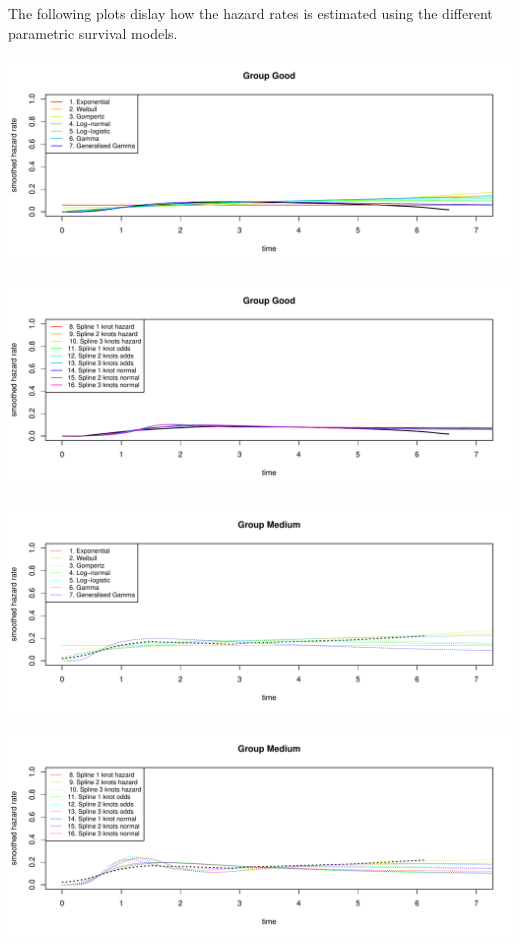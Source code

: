 \documentclass[
]{article}
\begin{document}
The following plots dislay how the hazard rates is estimated using the
different parametric survival models.

\begin{flushleft}\includegraphics[height=0.29\textheight]{Images/plot_haz_pred-1} \end{flushleft}

\begin{flushleft}\includegraphics[height=0.29\textheight]{Images/plot_haz_pred-2} \end{flushleft}

\begin{flushleft}\includegraphics[height=0.29\textheight]{Images/plot_haz_pred-3} \end{flushleft}

\begin{flushleft}\includegraphics[height=0.29\textheight]{Images/plot_haz_pred-4} \end{flushleft}
\end{document}
